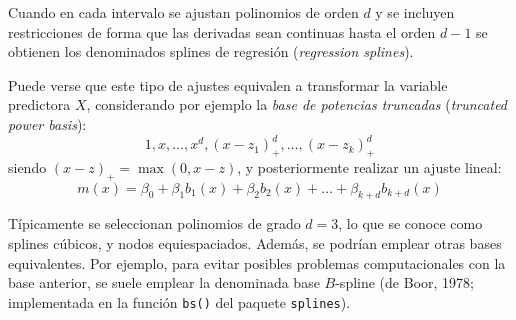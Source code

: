 \documentclass[
]{book}
\theoremstyle{break}
\theoremstyle{definition}
\theoremstyle{definition}
\theoremstyle{definition}
\theoremstyle{definition}
\theoremstyle{remark}
\begin{document}
Cuando en cada intervalo se ajustan polinomios de orden \(d\) y se incluyen restricciones de forma que las derivadas sean continuas hasta el orden \(d-1\) se obtienen los denominados splines de regresión (\emph{regression splines}).

Puede verse que este tipo de ajustes equivalen a transformar la variable predictora \(X\), considerando por ejemplo la \emph{base de potencias truncadas} (\emph{truncated power basis}):
\[1, x, \ldots, x^d, (x-z_1)_+^d,\ldots,(x-z_k)_+^d\]
siendo \((x - z)_+ = \max(0, x - z)\), y posteriormente realizar un ajuste lineal:
\[m(x) = \beta_0 + \beta_1 b_1(x) +  \beta_2 b_2(x) + \ldots  + \beta_{k+d} b_{k+d}(x)\]

Típicamente se seleccionan polinomios de grado \(d=3\), lo que se conoce como splines cúbicos, y nodos equiespaciados.
Además, se podrían emplear otras bases equivalentes. Por ejemplo, para evitar posibles problemas computacionales con la base anterior, se suele emplear la denominada base \(B\)-spline (de Boor, 1978; implementada en la función \texttt{bs()} del paquete \texttt{splines}).
\end{document}
